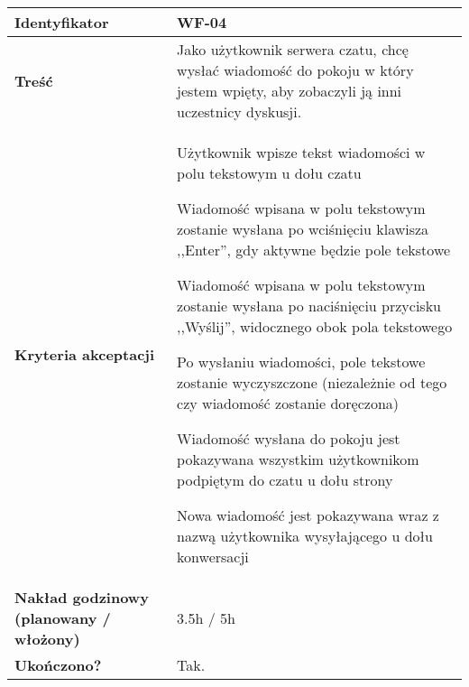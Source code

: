 \begin{tabular}{ | l | l | }
 \hline
   \textbf{Identyfikator} &
   WF-04
   \\

 \hline
   \textbf{Treść} & \parbox[t]{11.5cm}{\strut
     Jako użytkownik serwera czatu, chcę wysłać
     wiadomość do pokoju w który jestem wpięty, aby
     zobaczyli ją inni uczestnicy dyskusji.
   \strut}\\

 \hline
   \parbox[t]{4cm}{\textbf{Kryteria akceptacji}} & \parbox[t]{11.5cm}{\strut
     \begin{enumreq}
       \item Użytkownik wpisze tekst wiadomości w polu
       tekstowym u dołu czatu
       \item Wiadomość wpisana w polu tekstowym zostanie
       wysłana po wciśnięciu klawisza ,,Enter'', gdy aktywne
       będzie pole tekstowe
       \item Wiadomość wpisana w polu tekstowym zostanie
       wysłana po naciśnięciu przycisku ,,Wyślij'',
       widocznego obok pola tekstowego
       \item Po wysłaniu wiadomości, pole tekstowe zostanie
       wyczyszczone (niezależnie od tego czy wiadomość
       zostanie doręczona)
       \item Wiadomość wysłana do pokoju jest pokazywana
       wszystkim użytkownikom podpiętym do czatu u dołu
       strony
       \item Nowa wiadomość jest pokazywana wraz z nazwą
       użytkownika wysyłającego u dołu konwersacji
     \end{enumreq}
     \strut}
   \\

   \hline
     \parbox[t]{4cm}{\textbf{Nakład godzinowy (planowany / włożony)}} &
     \parbox[t]{11.5cm}{\strut
       3.5h / 5h
     \strut}\\
 \hline

   \parbox[t]{4cm}{\textbf{Ukończono?}} &
   \parbox[t]{11.5cm}{\strut
     Tak.
   \strut}\\

   \hline
\end{tabular}

\vspace{1em}

